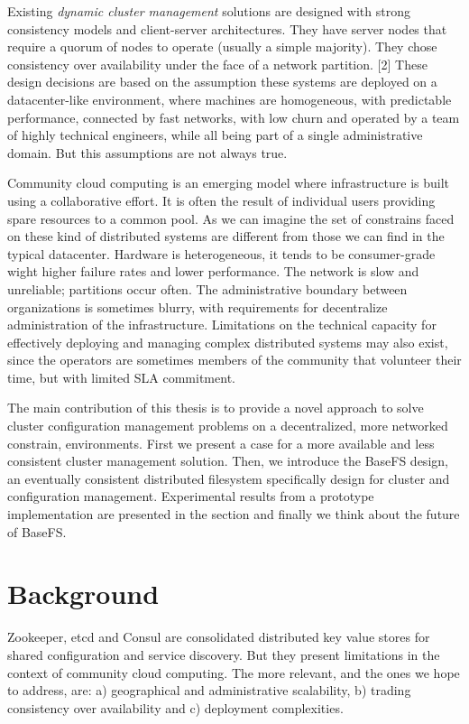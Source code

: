 \documentclass{sig-alternate}
\begin{document}
Existing \textit{dynamic cluster management} solutions are designed with strong consistency models and client-server architectures. They have server nodes that require a quorum of nodes to operate (usually a simple majority). They chose consistency over availability under the face of a network partition. [2] These design decisions are based on the assumption these systems are deployed on a datacenter-like environment, where machines are homogeneous, with predictable performance, connected by fast networks, with low churn and operated by a team of highly technical engineers, while all being part of a single administrative domain. But this assumptions are not always true.

Community cloud computing is an emerging model where infrastructure is built using a collaborative effort. It is often the result of individual users providing spare resources to a common pool. As we can imagine the set of constrains faced on these kind of distributed systems are different from those we can find in the typical datacenter. Hardware is heterogeneous, it tends to be consumer-grade wight higher failure rates and lower performance. The network is slow and unreliable; partitions occur often. The administrative boundary between organizations is sometimes blurry, with requirements for decentralize administration of the infrastructure. Limitations on the technical capacity for effectively deploying and managing complex distributed systems may also exist, since the operators are sometimes members of the community that volunteer their time, but with limited SLA commitment.

The main contribution of this thesis is to provide a novel approach to solve cluster configuration management problems on a decentralized, more networked constrain, environments. First we present a case for a more available and less consistent cluster management solution. Then, we introduce the BaseFS design, an eventually consistent distributed filesystem specifically design for cluster and configuration management. Experimental results from a prototype implementation are presented in the  section and finally we think about the future of BaseFS.

\section{Background}

Zookeeper, etcd and Consul are consolidated distributed key value stores for shared configuration and service discovery. But they present limitations in the context of community cloud computing. The more relevant, and the ones we hope to address, are: a) geographical and administrative scalability, b) trading consistency over availability and c) deployment complexities.
\end{document}
